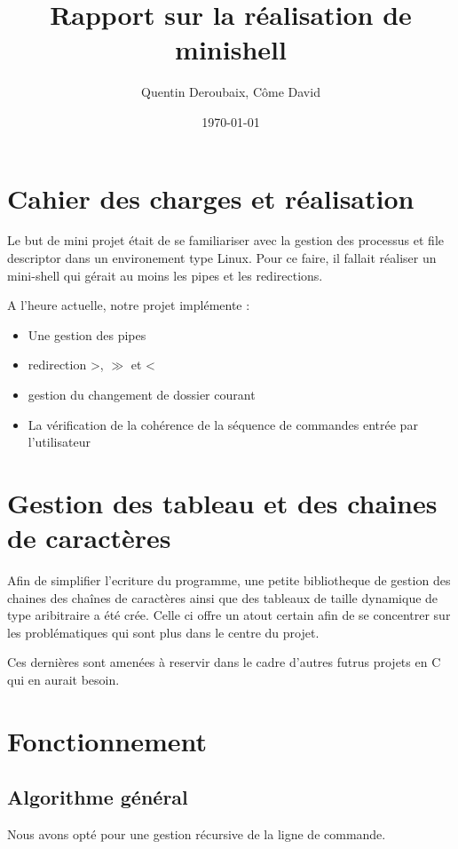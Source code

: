 \documentclass[fr]{article}
\begin{document}
\date{\today}

\title{Rapport sur la réalisation de minishell}
\author{Quentin Deroubaix, Côme David}
\maketitle

\section{Cahier des charges et réalisation}
Le but de mini projet était de se familiariser avec la gestion des
processus et file descriptor dans un environement type Linux. Pour ce
faire, il fallait réaliser un mini-shell qui gérait au moins les pipes
et les redirections.


A l'heure actuelle, notre projet implémente :

\begin{itemize}
\item Une gestion des pipes  
\item redirection >, $\gg$ et <
\item gestion du changement de dossier courant
\item La vérification de la cohérence de la séquence de commandes
  entrée par l'utilisateur
\end{itemize}

\section{Gestion des tableau et des chaines de caractères}
Afin de simplifier l'ecriture du programme, une petite bibliotheque de
gestion des chaines des chaînes de caractères ainsi que des tableaux
de taille dynamique de type aribitraire a été crée. 
Celle ci offre un atout certain afin de se concentrer sur les
problématiques qui sont plus dans le centre du projet.

Ces dernières sont amenées à reservir dans le cadre d'autres futrus projets
en C qui en aurait besoin.

\section{Fonctionnement}
\subsection{Algorithme général}
Nous avons opté pour une gestion récursive de la ligne de commande. 
\end{document}
